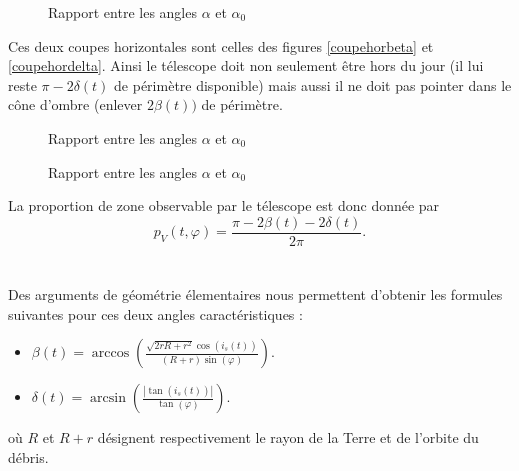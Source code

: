 \documentclass[a4paper,11pt]{article}
\numberwithin{section}{part}
\begin{document}
\begin{figure}\label{coupehor}
\begin{center}
\scriptsize
\def\figurewidth{0.6\linewidth}

\caption{Rapport entre les angles $\alpha$ et $\alpha_0$} \label{alpha}
\end{center}
\end{figure}

Ces deux coupes horizontales sont celles des figures \ref{coupehorbeta} et \ref{coupehordelta}. Ainsi le t\'elescope doit non seulement \^etre hors du jour (il lui reste $\pi-2\delta(t)$ de p\'erim\`etre disponible) mais aussi il ne doit pas pointer dans le c\^one d'ombre (enlever $2\beta(t))$ de p\'erim\`etre.

\begin{figure}\label{coupehorbeta}
\begin{center}
\scriptsize
\def\figurewidth{0.6\linewidth}

\caption{Rapport entre les angles $\alpha$ et $\alpha_0$} \label{alpha}
\end{center}
\end{figure}

\begin{figure}\label{coupehordelta}
\begin{center}
\scriptsize
\def\figurewidth{0.6\linewidth}

\caption{Rapport entre les angles $\alpha$ et $\alpha_0$} \label{alpha}
\end{center}
\end{figure}

La proportion de zone observable par le t\'elescope est donc donn\'ee par $$\displaystyle{p_{V}(t,\varphi)=\frac{\pi-2\beta(t)-2\delta(t)}{2\pi}}.$$ \\
\\
Des arguments de g\'eom\'etrie \'elementaires  nous permettent d'obtenir les formules suivantes pour ces deux angles caract\'eristiques : \\

\begin{itemize}
\item $\displaystyle{\beta(t)=\arccos\left(\frac{\sqrt{2rR+r^2}\cos(i_s(t))}{(R+r)\sin(\varphi)}\right)}$.
\item $\displaystyle{\delta(t)=\arcsin\left(\frac{|\tan(i_s(t))|}{\tan(\varphi)}\right)}$.
\end{itemize}

\vspace{0.5cm}
\noindent o\`u $R$ et $R+r$ d\'esignent respectivement le rayon de la Terre et de l'orbite du d\'ebris.\\
\end{document}
